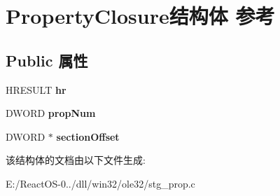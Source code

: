 \hypertarget{struct_property_closure}{}\section{Property\+Closure结构体 参考}
\label{struct_property_closure}
\subsection*{Public 属性}
\begin{DoxyCompactItemize}
\item 
\mbox{\label{struct_property_closure_a574dd5fcb0c6e49b5871c40fc04decde}} 
H\+R\+E\+S\+U\+LT {\bfseries hr}
\item 
\mbox{\label{struct_property_closure_a16a46edc1a17bbf6790890d4b2744e30}} 
D\+W\+O\+RD {\bfseries prop\+Num}
\item 
\mbox{\label{struct_property_closure_a5cec2411181da929de83f8369d071c18}} 
D\+W\+O\+RD $\ast$ {\bfseries section\+Offset}
\end{DoxyCompactItemize}


该结构体的文档由以下文件生成\+:\begin{DoxyCompactItemize}
\item 
E\+:/\+React\+O\+S-\/0../dll/win32/ole32/stg\+\_\+prop.\+c\end{DoxyCompactItemize}
